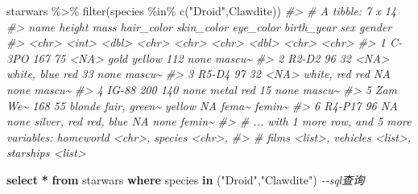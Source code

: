 \documentclass[
]{book}
\newenvironment{Shaded}{\begin{snugshade}}{\end{snugshade}}
\newcommand{\CommentTok}[1]{\textcolor[rgb]{0.56,0.35,0.01}{\textit{#1}}}
\newcommand{\FunctionTok}[1]{\textcolor[rgb]{0.00,0.00,0.00}{#1}}
\newcommand{\KeywordTok}[1]{\textcolor[rgb]{0.13,0.29,0.53}{\textbf{#1}}}
\newcommand{\NormalTok}[1]{#1}
\newcommand{\OperatorTok}[1]{\textcolor[rgb]{0.81,0.36,0.00}{\textbf{#1}}}
\newcommand{\OtherTok}[1]{\textcolor[rgb]{0.56,0.35,0.01}{#1}}
\newcommand{\SpecialCharTok}[1]{\textcolor[rgb]{0.00,0.00,0.00}{#1}}
\newcommand{\StringTok}[1]{\textcolor[rgb]{0.31,0.60,0.02}{#1}}
\begin{document}
\begin{Shaded}
\begin{Highlighting}[]
\NormalTok{starwars }\SpecialCharTok{\%\textgreater{}\%} 
  \FunctionTok{filter}\NormalTok{(species }\SpecialCharTok{\%in\%}  \FunctionTok{c}\NormalTok{(}\StringTok{"Droid"}\NormalTok{,}\StringTok{\textquotesingle{}Clawdite\textquotesingle{}}\NormalTok{))}
\CommentTok{\#\textgreater{} \# A tibble: 7 x 14}
\CommentTok{\#\textgreater{}   name    height  mass hair\_color skin\_color   eye\_color birth\_year sex   gender}
\CommentTok{\#\textgreater{}   \textless{}chr\textgreater{}    \textless{}int\textgreater{} \textless{}dbl\textgreater{} \textless{}chr\textgreater{}      \textless{}chr\textgreater{}        \textless{}chr\textgreater{}          \textless{}dbl\textgreater{} \textless{}chr\textgreater{} \textless{}chr\textgreater{} }
\CommentTok{\#\textgreater{} 1 C{-}3PO      167    75 \textless{}NA\textgreater{}       gold         yellow           112 none  mascu\textasciitilde{}}
\CommentTok{\#\textgreater{} 2 R2{-}D2       96    32 \textless{}NA\textgreater{}       white, blue  red               33 none  mascu\textasciitilde{}}
\CommentTok{\#\textgreater{} 3 R5{-}D4       97    32 \textless{}NA\textgreater{}       white, red   red               NA none  mascu\textasciitilde{}}
\CommentTok{\#\textgreater{} 4 IG{-}88      200   140 none       metal        red               15 none  mascu\textasciitilde{}}
\CommentTok{\#\textgreater{} 5 Zam We\textasciitilde{}    168    55 blonde     fair, green\textasciitilde{} yellow            NA fema\textasciitilde{} femin\textasciitilde{}}
\CommentTok{\#\textgreater{} 6 R4{-}P17      96    NA none       silver, red  red, blue         NA none  femin\textasciitilde{}}
\CommentTok{\#\textgreater{} \# ... with 1 more row, and 5 more variables: homeworld \textless{}chr\textgreater{}, species \textless{}chr\textgreater{},}
\CommentTok{\#\textgreater{} \#   films \textless{}list\textgreater{}, vehicles \textless{}list\textgreater{}, starships \textless{}list\textgreater{}}
\end{Highlighting}
\end{Shaded}

\begin{Shaded}
\begin{Highlighting}[]
\KeywordTok{select} \OperatorTok{*} \KeywordTok{from}\NormalTok{ starwars }\KeywordTok{where}\NormalTok{ species }\KeywordTok{in}\NormalTok{ (}\OtherTok{"Droid"}\NormalTok{,}\OtherTok{"Clawdite"}\NormalTok{) }\CommentTok{{-}{-}sql查询}
\end{Highlighting}
\end{Shaded}
\end{document}
